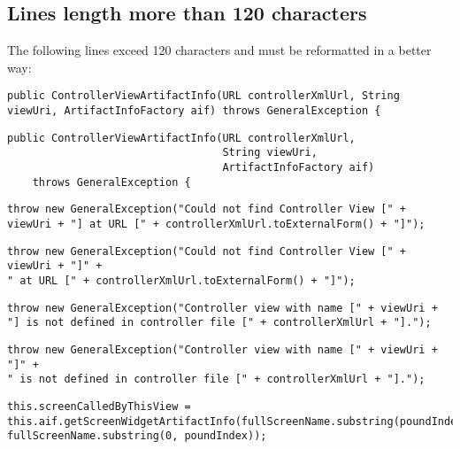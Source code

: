 \subsection{Lines length more than 120 characters}
The following lines exceed 120 characters and must be reformatted in a better way:
\begin{lstlisting}[firstnumber=45, caption={Line 45 violation of the rule}]
public ControllerViewArtifactInfo(URL controllerXmlUrl, String viewUri, ArtifactInfoFactory aif) throws GeneralException {
\end{lstlisting}
\begin{lstlisting}[firstnumber=45, caption={Line 45 possible solution}]
public ControllerViewArtifactInfo(URL controllerXmlUrl,
                                  String viewUri,
                                  ArtifactInfoFactory aif)
    throws GeneralException {
\end{lstlisting}
\noindent\makebox[\linewidth]{\rule{\linewidth}{0.4pt}}
\begin{lstlisting}[firstnumber=53, caption={Line 53 violation of the rule}]
throw new GeneralException("Could not find Controller View [" + viewUri + "] at URL [" + controllerXmlUrl.toExternalForm() + "]");
\end{lstlisting}
\begin{lstlisting}[firstnumber=53, caption={Line 53 possible solution}]
throw new GeneralException("Could not find Controller View [" + viewUri + "]" +
" at URL [" + controllerXmlUrl.toExternalForm() + "]");
\end{lstlisting}
\noindent\makebox[\linewidth]{\rule{\linewidth}{0.4pt}}
\begin{lstlisting}[firstnumber=57, caption={Line 57 violation of the rule}]
throw new GeneralException("Controller view with name [" + viewUri + "] is not defined in controller file [" + controllerXmlUrl + "].");
\end{lstlisting}
\begin{lstlisting}[firstnumber=57, caption={Line 57 possible solution}]
throw new GeneralException("Controller view with name [" + viewUri + "]" +
" is not defined in controller file [" + controllerXmlUrl + "].");
\end{lstlisting}
\noindent\makebox[\linewidth]{\rule{\linewidth}{0.4pt}}
\begin{lstlisting}[firstnumber=65, caption={Line 65 violation of the rule}]
this.screenCalledByThisView = this.aif.getScreenWidgetArtifactInfo(fullScreenName.substring(poundIndex+1), fullScreenName.substring(0, poundIndex));
\end{lstlisting}
